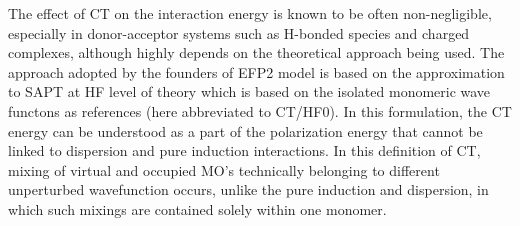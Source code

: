 The effect of CT on the interaction energy 
is known to be often non\hyp{}negligible, especially
in donor\hyp{}acceptor systems such as H\hyp{}bonded species
and charged complexes, although highly depends on the theoretical
approach being used. 
The approach adopted by the founders of EFP2 model
is based on
the approximation to SAPT at HF level of theory 
which is based on the isolated monomeric wave functons
as references (here abbreviated to CT/HF0).
In this formulation, the CT energy can be understood
as a part of the polarization energy that cannot be
linked to dispersion and pure induction interactions. 
In this definition of CT, mixing of virtual and occupied MO's
technically belonging to different unperturbed wavefunction occurs,
unlike the pure induction and dispersion, in which such mixings are contained
solely within one monomer.
%
%

